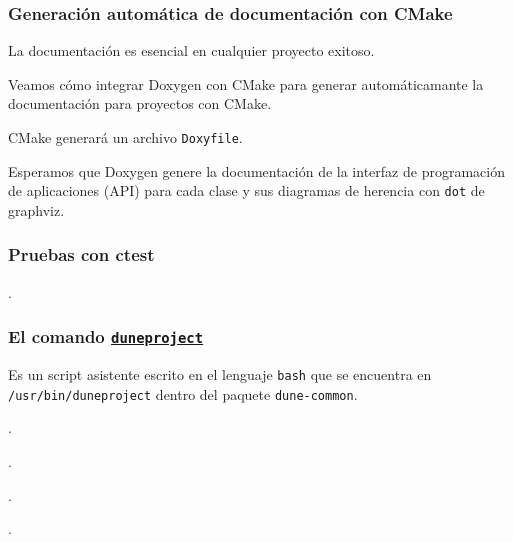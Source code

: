 \begin{frame}[fragile]
	\frametitle{Generación automática de documentación con CMake}
	La documentación es esencial en cualquier proyecto exitoso.

	Veamos cómo integrar Doxygen con CMake para generar
	automáticamante la documentación para proyectos con CMake.

	CMake generará un archivo \lstinline{Doxyfile}.

	Esperamos que Doxygen genere la documentación de la interfaz de
	programación de aplicaciones (API) para cada clase y sus
	diagramas de herencia con \lstinline{dot} de graphviz.
\end{frame}

\begin{frame}[fragile]
	\frametitle{Pruebas con ctest}
	.
\end{frame}



\begin{frame}[fragile]
	\frametitle{El comando \href{https://gitlab.dune-project.org/core/dune-common/-/raw/master/bin/duneproject}{\lstinline{duneproject}}}

	Es un script asistente escrito en el lenguaje \lstinline{bash}
	que se encuentra en \lstinline{/usr/bin/duneproject}
	dentro del paquete \lstinline{dune-common}.
\end{frame}

\begin{frame}
	.
\end{frame}

\begin{frame}
	.
\end{frame}

\begin{frame}
	.
\end{frame}

\begin{frame}
	.
\end{frame}

